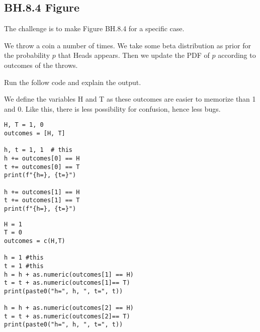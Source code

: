 

\subsection{BH.8.4 Figure}
The challenge is to make Figure BH.8.4 for a specific case.

We throw a coin a number of times. We take some beta distribution as prior for the probability $p$ that Heads appears. Then we update the PDF of $p$ according to outcomes of the throws.

\begin{exercise}
Run the follow code and explain the output.

We define the variables H and T as these outcomes are easier to memorize than 1 and 0. Like this, there is less possibility for confusion, hence less bugs.

\begin{verbatim}
H, T = 1, 0
outcomes = [H, T]

h, t = 1, 1  # this
h += outcomes[0] == H
t += outcomes[0] == T
print(f"{h=}, {t=}")

h += outcomes[1] == H
t += outcomes[1] == T
print(f"{h=}, {t=}")
\end{verbatim}

\begin{verbatim}
H = 1
T = 0
outcomes = c(H,T)

h = 1 #this
t = 1 #this
h = h + as.numeric(outcomes[1] == H)
t = t + as.numeric(outcomes[1]== T)
print(paste0("h=", h, ", t=", t))

h = h + as.numeric(outcomes[2] == H)
t = t + as.numeric(outcomes[2]== T)
print(paste0("h=", h, ", t=", t))
\end{verbatim}

\end{exercise}


